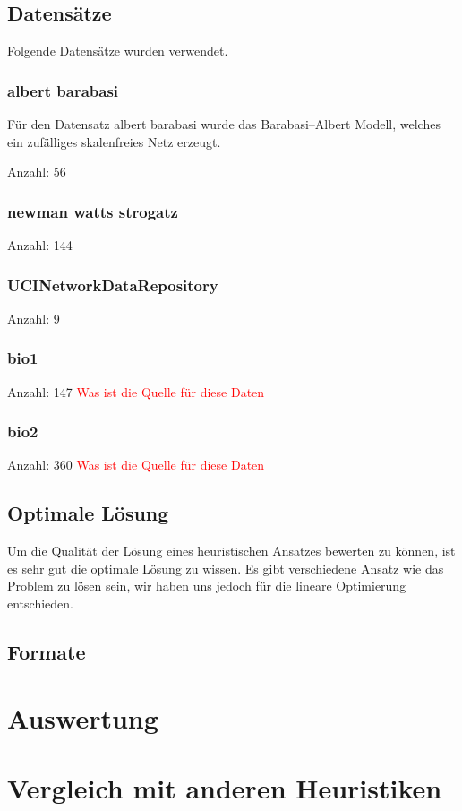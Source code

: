 \documentclass[12pt,a4paper,onecolumn,oneside,titlepage]{article}
\newcommand\todo[1]{\textcolor{red}{#1}}
\begin{document}
\subsection{Datensätze}
Folgende Datensätze wurden verwendet.
\subsubsection{albert barabasi}
Für den Datensatz albert barabasi wurde das Barabasi–Albert Modell, welches ein zufälliges skalenfreies Netz erzeugt.\cite{Albert02}

Anzahl: 56

\subsubsection{newman watts strogatz}
Anzahl: 144
\subsubsection{UCINetworkDataRepository}
Anzahl: 9
\subsubsection{bio1}
Anzahl: 147
\todo{Was ist die Quelle für diese Daten}
\subsubsection{bio2}
Anzahl: 360
\todo{Was ist die Quelle für diese Daten}

\subsection{Optimale Lösung}
Um die Qualität der Lösung eines heuristischen Ansatzes bewerten zu können, ist es sehr gut die optimale Lösung zu wissen. Es gibt verschiedene Ansatz wie das Problem zu lösen sein, wir haben uns jedoch für die lineare Optimierung entschieden.


\subsection{Formate}
\section{Auswertung}
\section{Vergleich mit anderen Heuristiken}
\end{document}
